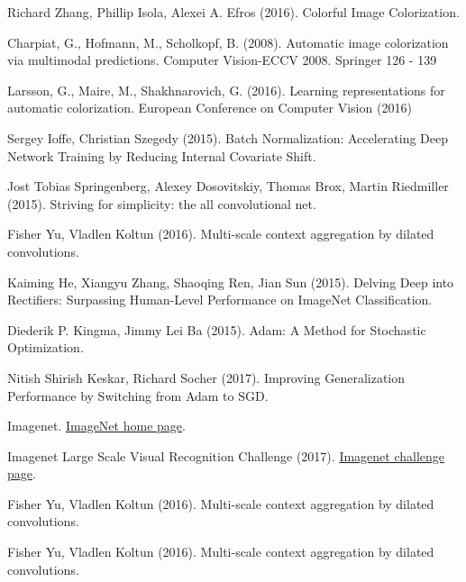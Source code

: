 \documentclass[twoside,twocolumn]{article}
\begin{document}
\begin{thebibliography}{99} %

Richard Zhang, Phillip Isola, Alexei A. Efros (2016).
\newblock Colorful Image Colorization.
 
Charpiat, G., Hofmann, M., Scholkopf, B. (2008).
\newblock Automatic image colorization via multimodal
predictions.
\newblock Computer Vision-ECCV 2008. Springer 126 - 139

Larsson, G., Maire, M., Shakhnarovich, G. (2016).
\newblock Learning representations for automatic
colorization.
\newblock European Conference on Computer Vision (2016)

Sergey Ioffe, Christian Szegedy (2015).
\newblock Batch Normalization: Accelerating Deep Network Training by Reducing Internal Covariate Shift.

Jost Tobias Springenberg, Alexey Dosovitskiy, Thomas Brox, Martin Riedmiller (2015).
\newblock Striving for simplicity: the all convolutional net.

Fisher Yu, Vladlen Koltun (2016).
\newblock Multi-scale context aggregation by dilated convolutions.

Kaiming He, Xiangyu Zhang, Shaoqing Ren, Jian Sun (2015).
\newblock Delving Deep into Rectifiers: Surpassing Human-Level Performance on ImageNet Classification.

Diederik P. Kingma, Jimmy Lei Ba (2015).
\newblock Adam: A Method for Stochastic Optimization.

Nitish Shirish Keskar, Richard Socher (2017).
\newblock Improving Generalization Performance by Switching from Adam to SGD.

Imagenet.
\newblock \href{http://www.image-net.org/index}{ImageNet home page}.

Imagenet Large Scale Visual Recognition Challenge (2017).
\newblock \href{http://www.image-net.org/challenges/LSVRC/}{Imagenet challenge page}.

Fisher Yu, Vladlen Koltun (2016).
\newblock Multi-scale context aggregation by dilated convolutions.

Fisher Yu, Vladlen Koltun (2016).
\newblock Multi-scale context aggregation by dilated convolutions.
\end{thebibliography}

\end{document}
